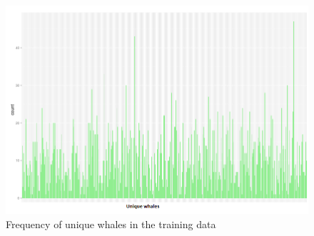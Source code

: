\begin{figure}
	\centering
	\includegraphics[width=\linewidth]{Images/FrequencyPlot}
	\caption{Frequency of unique whales in the training data}
	\label{fig:whale-frequency}
\end{figure}	